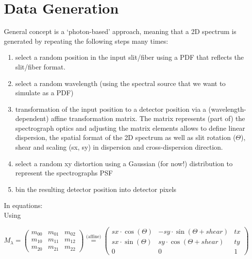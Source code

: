 \documentclass[modern]{aastex61}
\begin{document}
\section{Data Generation}
General concept is a `photon-based' approach, meaning that a 2D spectrum is generated by repeating the following steps many times:
\begin{enumerate}
    \item select a random position in the input slit/fiber using a PDF that reflects the slit/fiber format.
    \item select a random wavelength (using the spectral source that we want to simulate as a PDF)
    \item transformation of the input position to a detector position via a (wavelength-dependent) affine transformation matrix.
The matrix represents (part of) the spectrograph optics and adjusting the matrix elements allows to define linear dispersion, the spatial format of the 2D spectrum as well as slit rotation ($\Theta$), shear and scaling (sx, sy) in dispersion and cross-dispersion direction.
    \item select a random xy distortion using a Gaussian (for now!) distribution to represent the spectrographs PSF
    \item bin the resulting detector position into detector pixels
\end{enumerate}
In equations:\\
Using

   	\[
	M_{\lambda} = \begin{pmatrix} m_{00} & m_{01} & m_{02} \\ m_{10} & m_{11} & m_{12} \\ m_{20} & m_{21} & m_{22} \end{pmatrix}  \stackrel{\text{(affine)}}{=} \begin{pmatrix} sx \cdot \cos(\Theta) & -sy \cdot \sin(\Theta+shear) & tx \\ sx \cdot \sin(\Theta) & sy \cdot \cos(\Theta+shear) & ty \\ 0 & 0 & 1 \end{pmatrix}
	\]
\end{document}
